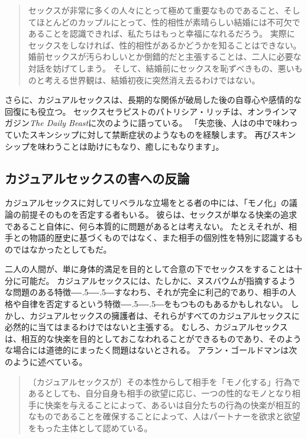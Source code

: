 \documentclass[paper=a4,book,openany]{jlreq}
\newcommand{\ig}[1]{}           %
\def\DDASH{―\kern-.5\zw―\kern-.5\zw―} %
\begin{document}
\begin{quote}
  セックスが非常に多くの人々にとって極めて重要なものであること、そしてほとんどのカップルにとって、性的相性が素晴らしい結婚には不可欠であることを認識できれば、私たちはもっと幸福になれるだろう。
実際にセックスをしなければ、性的相性があるかどうかを知ることはできない。
婚前セックスが汚らわしいとか倒錯的だと主張することは、二人に必要な対話を妨げてしまう。
そして、結婚前にセックスを恥ずべきもの、悪いものと考える世界観は、結婚初夜に突然消え去るわけではない。
\citep{filipovic12:_moral_case_sex_marr}
\end{quote}

さらに、カジュアルセックスは、長期的な関係が破局した後の自尊心や感情的な回復にも役立つ。
セックスセラピストのパトリシア・リッチは、オンラインマガジン\emph{The Daily Beast}に次のように語っている。
「失恋後、人はの中で味わっていたスキンシップに対して禁断症状のようなものを経験します。
再びスキンシップを味わうことは助けにもなり、癒しにもなります」\citep{shire14:_peop_who_have}。

\subsection{カジュアルセックスの害への反論}

カジュアルセックスに対してリベラルな立場をとる者の中には、「モノ化」の議論の前提そのものを否定する者もいる。
彼らは、セックスが単なる快楽の追求であること自体に、何ら本質的に問題があるとは考えない。
たとえそれが、相手との物語的歴史に基づくものではなく、また相手の個別性を特別に認識するものではなかったとしてもだ。

二人の人間が、単に身体的満足を目的として合意の下でセックスをすることは十分に可能だ。
カジュアルセックスには、たしかに、ヌスバウムが指摘するような問題のある特徴{\DDASH}すなわち、それが完全に利己的であり、相手の人格や自律を否定するという特徴{\DDASH}をもつものもあるかもしれない。
しかし、カジュアルセックスの擁護者は、それらがすべてのカジュアルセックスに必然的に当てはまるわけではないと主張する。
むしろ、カジュアルセックスは、相互的な快楽を目的としておこなわれることができるものであり、そのような場合には道徳的にまったく問題はないとされる。
アラン・ゴールドマンは次のように述べている。

\begin{quote}
〔カジュアルセックスが〕その本性からして相手を「モノ化する」行為であるとしても、自分自身も相手の欲望に応じ、一つの性的なモノとなり相手に快楽を与えることによって、あるいは自分たちの行為の快楽が相互的なものであることを確保することによって、人はパートナーを欲求と欲望をもった主体として認めている。
\citep[p.283]{goldman77:_plain_sex}\ig{Alan Goldman}
\end{quote}
\end{document}
